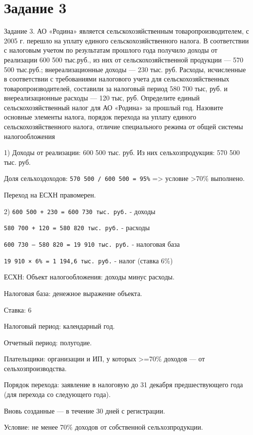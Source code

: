 \documentclass[14pt,a4paper]{extarticle}
\begin{document}
\section{Задание 3}
Задание 3. АО «Родина» является сельскохозяйственным товаропроизводителем, с
2005 г. перешло на уплату единого сельскохозяйственного налога. В соответствии с
налоговым учетом по результатам прошлого года получило доходы от реализации 600 500
тыс.руб., из них от сельскохозяйственной продукции — 570 500 тыс.руб.;
внереализационные доходы — 230 тыс. руб. Расходы, исчисленные в соответствии с
требованиями налогового учета для сельскохозяйственных товаропроизводителей,
составили за налоговый период 580 700 тыс, руб. и внереализационные расходы — 120
тыс, руб.
Определите единый сельскохозяйственный налог для АО «Родина» за прошлый год.
Назовите основные элементы налога, порядок перехода на уплату единого
сельскохозяйственного налога, отличие специального режима от общей системы
налогообложения

1) Доходы от реализации: 600 500 тыс. руб.
Из них сельхозпродукция: 570 500 тыс. руб.

Доля сельхоздоходов:
\texttt{570 500 / 600 500 = 95\%} => условие >70\% выполнено.

Переход на ЕСХН правомерен.

2) \texttt{600 500 + 230 = 600 730 тыс. руб.} - доходы

\texttt{580 700 + 120 = 580 820 тыс. руб.} - расходы

\texttt{600 730 – 580 820 = 19 910 тыс. руб.} - налоговая база

\texttt{19 910 × 6\% = 1 194,6 тыс. руб.} - налог (ставка 6\%)

ЕСХН:
Объект налогообложения: доходы минус расходы.

Налоговая база: денежное выражение объекта.

Ставка: 6%

Налоговый период: календарный год.

Отчетный период: полугодие.

Плательщики: организации и ИП, у которых >=70\% доходов — от сельхозпроизводства.

Порядок перехода:
 заявление в налоговую до 31 декабря предшествующего года (для перехода
со следующего года).

Вновь созданные — в течение 30 дней с регистрации.

Условие: не менее 70\% доходов от собственной сельхозпродукции.
\end{document}
